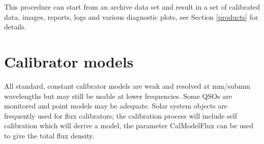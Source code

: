 \documentclass[11pt]{article}
\begin{document}
This procedure can start from an archive data set and result in a
set of calibrated data, images, reports, logs and various diagnostic
plots, see Section \ref{products} for details.

\section{Calibrator models}\label{calmodel}
All standard, constant calibrator models are weak and resolved at
mm/submm wavelengths but may still be usable at lower frequencies.
Some QSOs are monitored and point models may be adequate.
Solar system objects are frequently used for flux calibrators;
the calibration process will include self calibration which will
derive a model, the parameter CalModelFlux can be used to give the
total flux density.
\end{document}
